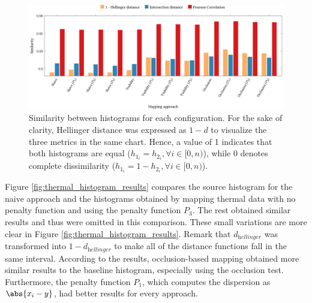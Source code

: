 \begin{figure}
    \centering
    \includegraphics[width=\linewidth]{figs/thermal_projection/distance_similarity.png}
	\caption{Similarity between histograms for each configuration. For the sake of clarity, Hellinger distance was expressed as $1 - d$ to visualize the three metrics in the same chart. Hence, a value of 1 indicates that both histograms are equal ($h_{1_{i}} = h_{2_{i}}, \forall i \in [0, n)$), while 0 denotes complete dissimilarity ($h_{1_{i}} = 1 - h_{2_{i}}, \forall i \in [0, n)$).}
	\label{fig:thermal_histogram_results_02}
\end{figure}


Figure \ref{fig:thermal_histogram_results} compares the source histogram for the naive approach and the histograms obtained by mapping thermal data with no penalty function and using the penalty function $P_3$. The rest obtained similar results and thus were omitted in this comparison. These small variations are more clear in Figure \ref{fig:thermal_histogram_results}. Remark that $d_{\textit{hellinger}}$ was transformed into $1 - d_{\textit{hellinger}}$ to make all of the distance functions fall in the same interval. According to the results, occlusion-based mapping obtained more similar results to the baseline histogram, especially using the occlusion test. Furthermore, the penalty function $P_1$, which computes the dispersion as $\abs{x_i - y}$, had better results for every approach.

